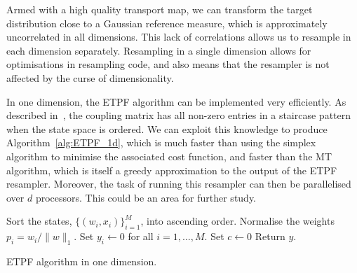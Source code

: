\documentclass[final]{siamltex}
\begin{document}
Armed with a high quality transport map, we can transform the target
distribution close to a Gaussian reference measure, which is
approximately uncorrelated in all dimensions. This lack of correlations allows us to
resample in each dimension separately. Resampling in a
single dimension allows for optimisations in resampling code, and also
means that the resampler is not affected by the curse of
dimensionality. 

In one
dimension, the ETPF algorithm can be implemented very efficiently. As
described in~\cite{reich2013nonparametric}, the coupling matrix has
all non-zero entries in a staircase pattern when the state space is
ordered. We can exploit this knowledge to produce
Algorithm~\ref{alg:ETPF_1d}, which is much faster than using the
simplex algorithm to minimise the associated cost function, and faster
than the MT algorithm\cite{cotter2015parallel}, which is itself a
greedy approximation to the output of the ETPF resampler. Moreover, the task of
running this resampler can then be parallelised over $d$
processors. This could be an area for further study.

\begin{table}[!htpb]
\begin{algorithm}[H]
\DontPrintSemicolon
\BlankLine
Sort the states, $\{(w_i, x_i)\}_{i=1}^M$, into ascending order.\;
Normalise the weights $p_i = w_i/\|w\|_1$.\;
Set $y_i \leftarrow 0$ for all $i=1,\dots,M$.\;
Set $c \leftarrow 0$\;
Return $y$.\;
\caption{ETPF algorithm in one dimension.\label{alg:ETPF_1d}}
\end{algorithm}
\end{table}

\end{document}
